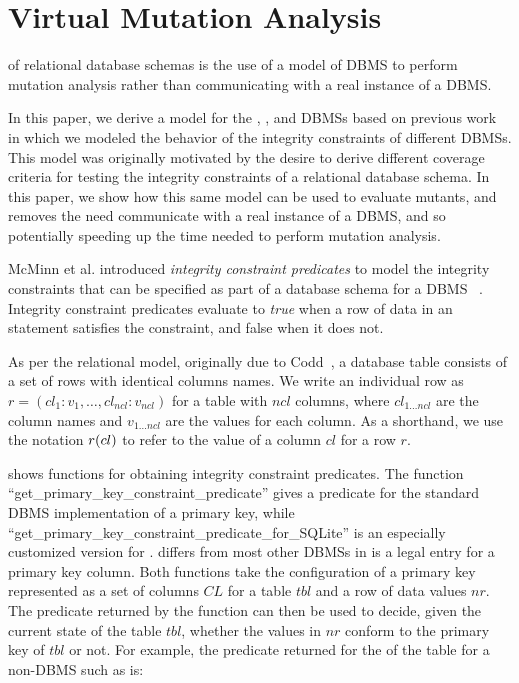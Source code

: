 


\vspace{-1ex}
\section{Virtual Mutation Analysis}
\label{sec:virtual-mutation-analysis}
\VMA of relational database schemas is the use of a model of DBMS to perform mutation analysis rather than communicating with a real instance of a DBMS.

In this paper, we derive a model for the \HyperSQL, \Postgres, and \SQLite DBMSs based on previous work \cite{McMinn2015} in which we modeled the behavior of the integrity constraints of different DBMSs. This model was originally motivated by the desire to derive different coverage criteria for testing the integrity constraints of a relational database schema. In this paper, we show how this same model can be used to evaluate mutants, and removes the need communicate with a real instance of a DBMS, and so potentially speeding up the time needed to perform mutation analysis.

McMinn et al. introduced {\it integrity constraint predicates} to model the integrity constraints that can be specified as part of a database schema for a DBMS~\cite{McMinn2015} . Integrity constraint predicates evaluate to {\it true} when a row of data in an \INSERT statement satisfies the constraint, and false when it does not.

As per the relational model, originally due to Codd~\cite{Codd1970}, a database table consists of a set of rows with identical columns names. We write an individual row as $r = (cl_1:v_1, \dots, cl_{ncl}:v_{ncl})$ for a table with $ncl$ columns, where $cl_{1 \ldots ncl}$ are the column names and $v_{1 \ldots ncl}$ are the values for each column. As a shorthand, we use the notation $r (cl)$ to refer to the value of a column $cl$ for a row $r$.

\begin{sloppypar}
 shows functions for obtaining integrity constraint predicates. The function
``get\_primary\_key\_constraint\_predicate'' gives a predicate for the standard DBMS implementation of a primary key,
while ``get\_primary\_key\_constraint\_predicate\_for\_SQLite'' is an especially customized version for \SQLite. \SQLite
differs from most other DBMSs in \NULL is a legal entry for a primary key column. Both functions take the
configuration of a primary key represented as a set of columns $CL$ for a table $tbl$ and a row of data values $nr$. The
predicate returned by the function can then be used to decide, given the current state of the table $tbl$, whether the
values in $nr$ conform to the primary key of $tbl$ or not. For example, the predicate returned for the \PK of the
 table for a non-\SQLite DBMS such as \Postgres is:
\end{sloppypar}

